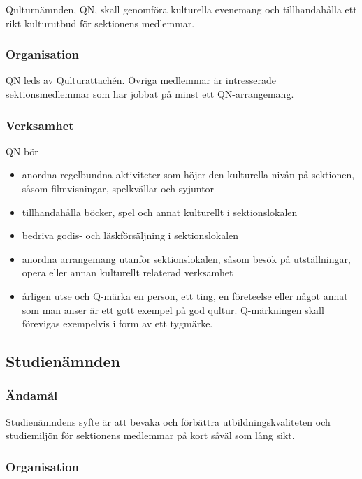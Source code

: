 \documentclass{dgovdoc}
\begin{document}
Qulturnämnden, QN, skall genomföra kulturella evenemang och tillhandahålla ett
rikt kulturutbud för sektionens medlemmar.

\subsubsection{Organisation}

QN leds av Qulturattachén. Övriga medlemmar är intresserade sektionsmedlemmar
som har jobbat på minst ett QN-arrangemang.

\subsubsection{Verksamhet}

QN bör

\begin{itemize}
  \item anordna regelbundna aktiviteter som höjer den kulturella nivån på
    sektionen, såsom filmvisningar, spelkvällar och syjuntor
  \item tillhandahålla böcker, spel och annat kulturellt i sektionslokalen
  \item bedriva godis- och läskförsäljning i sektionslokalen
  \item anordna arrangemang utanför sektionslokalen, såsom besök på
    utställningar, opera eller annan kulturellt relaterad verksamhet
  \item årligen utse och Q-märka en person, ett ting, en företeelse eller något
    annat som man anser är ett gott exempel på god qultur. Q-märkningen skall
    förevigas exempelvis i form av ett tygmärke.
\end{itemize}

\subsection{Studienämnden}

\subsubsection{Ändamål}

Studienämndens syfte är att bevaka och förbättra utbildningskvaliteten och
studiemiljön för sektionens medlemmar på kort såväl som lång sikt.

\subsubsection{Organisation}
\end{document}
